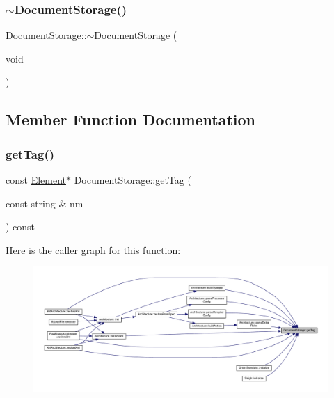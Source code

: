 \subsubsection{\texorpdfstring{$\sim$DocumentStorage()}{~DocumentStorage()}}
{\footnotesize\ttfamily Document\+Storage\+::$\sim$\+Document\+Storage (\begin{DoxyParamCaption}\item[{void}]{ }\end{DoxyParamCaption})}



\subsection{Member Function Documentation}
\mbox{\label{class_document_storage_a10fdfff18994e73daacdb63b4df7f863}} 
\subsubsection{\texorpdfstring{getTag()}{getTag()}}
{\footnotesize\ttfamily const \mbox{\hyperlink{class_element}{Element}}$\ast$ Document\+Storage\+::get\+Tag (\begin{DoxyParamCaption}\item[{const string \&}]{nm }\end{DoxyParamCaption}) const}

Here is the caller graph for this function\+:
\nopagebreak
\begin{figure}[H]
\begin{center}
\leavevmode
\includegraphics[width=350pt]{class_document_storage_a10fdfff18994e73daacdb63b4df7f863_icgraph}
\end{center}
\end{figure}
\mbox{\label{class_document_storage_aaba17671821692988f7b2b78eb97f27e}} 
